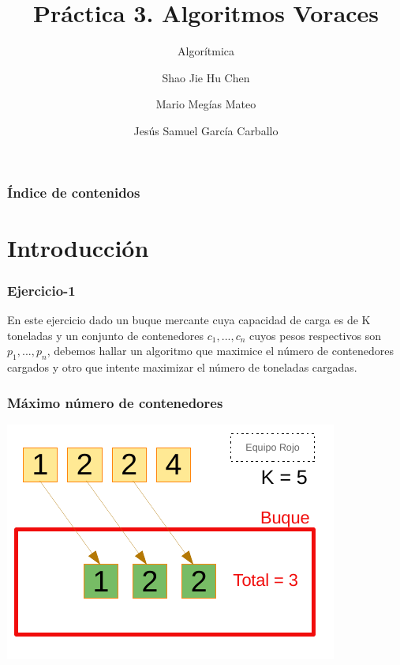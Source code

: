 \documentclass[13pt]{beamer}
\author{Shao Jie Hu Chen \and Mario Megías Mateo \and Jesús Samuel García Carballo}
\title{Práctica 3. Algoritmos Voraces}
\subtitle{Algorítmica}
\institute{Equipo Rojo}
\begin{document}
	
	\begin{frame}[plain]
		\maketitle
	\end{frame}
	
	\begin{frame}
		\frametitle{Índice de contenidos}
		\tableofcontents
	\end{frame}


    \section{Introducción}

    \begin{frame}
		\frametitle{Ejercicio-1}
		En este ejercicio dado un buque mercante cuya capacidad de carga es de K toneladas y un conjunto de contenedores $c_1,...,c_n$ cuyos
		pesos respectivos son $p_1,...,p_n$, debemos hallar un algoritmo que maximice el número de contenedores cargados y otro que intente 
		maximizar el número de toneladas cargadas.
	\end{frame}

    \begin{frame}
		\frametitle{Máximo número de contenedores}
		\begin{center}
			\includegraphics[scale=1.5]{./img/DibCont1.pdf}
		\end{center}
	\end{frame}
\end{document}
